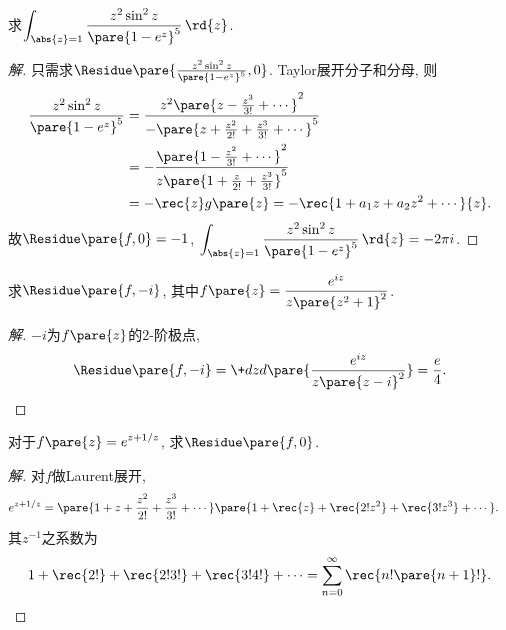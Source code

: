 \documentclass[../ComplexVariable.tex]{subfiles}
\begin{document}
\begin{sample}
    \begin{ex}
        求$\displaystyle \int_{\abs{z}=1} \frac{z^2\sin^2 z}{\pare{1-e^z}^5}\,\rd{z}$.
    \end{ex}
    \begin{proof}[解]
        只需求$\Residue\pare{\frac{z^2\sin^2 z}{\pare{1-e^z}^5}, 0}$. Taylor展开分子和分母, 则
        \begin{align*}
            \frac{z^2\sin^2 z}{\pare{1-e^z}^5} &= \frac{z^2 \pare{z-\frac{z^3}{3!} + \cdots}^2}{-\pare{z+\frac{z^2}{2!} + \frac{z^3}{3!} + \cdots}^5}\\ &= -\frac{\pare{1-\frac{z^2}{3!} + \cdots}^2}{z\pare{1+\frac{z}{2!}+\frac{z^3}{3!}}^5} \\
            &= -\rec{z}g\pare{z} = -\rec{1+a_1z + a_2z^2 + \cdots}{z}.
        \end{align*}
        故$\Residue\pare{f,0} = -1$, $\displaystyle \int_{\abs{z}=1} \frac{z^2\sin^2 z}{\pare{1-e^z}^5}\,\rd{z} = -2\pi i$.
    \end{proof}
\end{sample}
\begin{sample}
    \begin{ex}
        求$\Residue\pare{f,-i}$, 其中$\displaystyle f\pare{z} = \frac{e^{iz}}{z\pare{z^2+1}^2}$.
    \end{ex}
    \begin{proof}[解]
        $-i$为$f\pare{z}$的$2$-阶极点,
        \[ \Residue\pare{f,-i} = \+dzd{}\pare{\frac{e^{iz}}{z\pare{z-i}^2}} = \frac{e}{4}. \]
    \end{proof}
\end{sample}
\begin{sample}
    \begin{ex}
        对于$\displaystyle f\pare{z} = e^{z+1/z}$, 求$\Residue\pare{f,0}$.
    \end{ex}
    \begin{proof}[解]
        对$f$做Laurent展开,
        \begin{align*}
            e^{z+1/z} &= \pare{1+z+\frac{z^2}{2!}+\frac{z^3}{3!}+\cdots}\pare{1+\rec{z}+\rec{2!z^2}+\rec{3!z^3}+\cdots}.
        \end{align*}
        其$z^{-1}$之系数为
        \[ 1 + \rec{2!} + \rec{2!3!} + \rec{3!4!} + \cdots = \sum_{n=0}^\infty \rec{n!\pare{n+1}!}. \qedhere \]
    \end{proof}
\end{sample}
\end{document}
